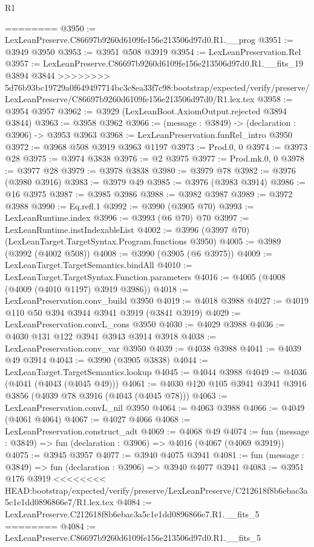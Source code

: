 \begin{lexlean}{R1}
\begin{coremodule}
{{{{{{{{{{{{{{{{{{{{{{{{{{{{{{{{{{{{{{{{{{{{{{{{{{{{{{{{{{{{{{{{{{{{{{{{{{{{{{{{{{{{{{{{{{{{{{{{{{{{{{{{{{{{{{{{{{{{{{{{{{{{{{{{{{{{{{{{{{{{{{{{{{{{{{{{{{{{{{{{{{{{{{{{{{{{{{{{{{{{{{{{{{========
@3950 := LexLeanPreserve.C86697b9260d6109fe156e213506d97d0.R1.__prog
@3951 := @3949 @3950
@3953 := @3951 @508 @3919
@3954 := LexLeanPreservation.Rel
@3957 := LexLeanPreserve.C86697b9260d6109fe156e213506d97d0.R1.__fits_19 @3894 @3844
>>>>>>>> 5d76b93bc19729a0f649497714bc3c8ea33f7c98:bootstrap/expected/verify/preserve/LexLeanPreserve/C86697b9260d6109fe156e213506d97d0/R1.lex.tex
@3958 := @3954 @3957
@3962 := @3929 (LexLeanBoot.AxiomOutput.rejected @3894 @3844)
@3963 := @3958 @3962
@3966 := (message : @3849) -> (declaration : @3906) -> @3953 @3963
@3968 := LexLeanPreservation.funRel_intro @3950
@3972 := @3968 @508 @3919 @3963 @1197
@3973 := Prod.{0, 0}
@3974 := @3973 @28
@3975 := @3974 @3838
@3976 := @2 @3975
@3977 := Prod.mk.{0, 0}
@3978 := @3977 @28
@3979 := @3978 @3838
@3980 := @3979 @78
@3982 := @3976 (@3980 @3916)
@3983 := @3979 @49
@3985 := @3976 (@3983 @3914)
@3986 := @16 @3975
@3987 := @3985 @3986
@3988 := @3982 @3987
@3989 := @3972 @3988
@3990 := Eq.refl.{1}
@3992 := @3990 (@3905 @70)
@3993 := LexLeanRuntime.index
@3996 := @3993 (@6 @70) @70
@3997 := LexLeanRuntime.instIndexableList
@4002 := @3996 (@3997 @70) (LexLeanTarget.TargetSyntax.Program.functions @3950)
@4005 := @3989 (@3992 (@4002 @508))
@4008 := @3990 (@3905 (@6 @3975))
@4009 := LexLeanTarget.TargetSemantics.bindAll
@4010 := LexLeanTarget.TargetSyntax.Function.parameters
@4016 := @4005 (@4008 (@4009 (@4010 @1197) @3919 @3986))
@4018 := LexLeanPreservation.conv_build @3950
@4019 := @4018 @3988
@4027 := @4019 @110 @50 @394 @3944 @3941 @3919 (@3841 @3919)
@4029 := LexLeanPreservation.convL_cons @3950
@4030 := @4029 @3988
@4036 := @4030 @131 @122 @3941 @3943 @3914 @3918
@4038 := LexLeanPreservation.conv_var @3950
@4039 := @4038 @3988
@4041 := @4039 @49 @3914
@4043 := @3990 (@3905 @3838)
@4044 := LexLeanTarget.TargetSemantics.lookup
@4045 := @4044 @3988
@4049 := @4036 (@4041 (@4043 (@4045 @49)))
@4061 := @4030 @120 @105 @3941 @3941 @3916 @3856 (@4039 @78 @3916 (@4043 (@4045 @78)))
@4063 := LexLeanPreservation.convL_nil @3950
@4064 := @4063 @3988
@4066 := @4049 (@4061 @4064)
@4067 := @4027 @4066
@4068 := LexLeanPreservation.construct_adt
@4069 := @4068 @49
@4074 := fun (message : @3849) => fun (declaration : @3906) => @4016 (@4067 (@4069 @3919))
@4075 := @3945 @3957
@4077 := @3940 @4075 @3941
@4081 := fun (message : @3849) => fun (declaration : @3906) => @3940 @4077 @3941
@4083 := @3951 @176 @3919
<<<<<<<< HEAD:bootstrap/expected/verify/preserve/LexLeanPreserve/C212618f8b6ebac3a5c1e1dd0896866e7/R1.lex.tex
@4084 := LexLeanPreserve.C212618f8b6ebac3a5c1e1dd0896866e7.R1.__fits_5
========
@4084 := LexLeanPreserve.C86697b9260d6109fe156e213506d97d0.R1.__fits_5
}}}}}}}}}}}}}}}}}}}}}}}}}}}}}}}}}}}}}}}}}}}}}}}}}}}}}}}}}}}}}}}}}}}}}}}}}}}}}}}}}}}}}}}}}}}}}}}}}}}}}}}}}}}}}}}}}}}}}}}}}}}}}}}}}}}}}}}}}}}}}}}}}}}}}}}}}}}}}}}}}}}}}}}}}}}}}}}}}}}}}}}}}}
\end{coremodule}
\end{lexlean}
